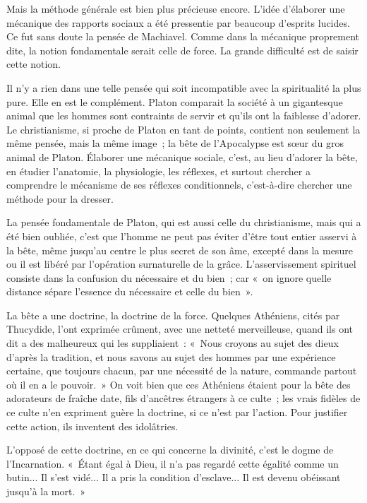 \documentclass[french,twoside]{book} %
\begin{document}
Mais la méthode générale est bien plus précieuse encore. L'idée d'élaborer une mécanique des rapports sociaux a été pressentie par beaucoup d'esprits lucides. Ce fut sans doute la pensée de Machiavel. Comme dans la mécanique proprement dite, la notion fondamentale serait celle de force. La grande difficulté est de saisir cette notion.\par
Il n'y a rien dans une telle pensée qui soit incompatible avec la spiritualité la plus pure. Elle en est le complément. Platon comparait la société à un gigantesque animal que les hommes sont contraints de servir et qu'ils ont la faiblesse d'adorer. Le christianisme, si proche de Platon en tant de points, contient non seulement la même pensée, mais la même image ; la bête de l'Apocalypse est sœur du gros animal de Platon. Élaborer une mécanique sociale, c'est, au lieu d'adorer la bête, en étudier l'anatomie, la physiologie, les réflexes, et surtout chercher a comprendre le mécanisme de ses réflexes conditionnels, c'est-à-dire chercher une méthode pour la dresser.\par
La pensée fondamentale de Platon, qui est aussi celle du christianisme, mais qui a été bien oubliée, c'est que l'homme ne peut pas éviter d'être tout entier asservi à la bête, même jusqu'au centre le plus secret de son âme, excepté dans la mesure ou il est libéré par l'opération surnaturelle de la grâce. L'asservissement spirituel consiste dans la confusion du nécessaire et du bien ; car « on ignore quelle distance sépare l'essence du nécessaire et celle du bien ».\par
La bête a une doctrine, la doctrine de la force. Quelques Athéniens, cités par Thucydide, l'ont exprimée crûment, avec une netteté merveilleuse, quand ils ont dit a des malheureux qui les suppliaient : « Nous croyons au sujet des dieux d'après la tradition, et nous savons au sujet des hommes par une expérience certaine, que toujours chacun, par une nécessité de la nature, commande partout où il en a le pouvoir. » On voit bien que ces Athéniens étaient pour la bête des adorateurs de fraîche date, fils d'ancêtres étrangers à ce culte ; les vrais fidèles de ce culte n'en expriment guère la doctrine, si ce n'est par l'action. Pour justifier cette action, ils inventent des idolâtries.\par
L'opposé de cette doctrine, en ce qui concerne la divinité, c'est le dogme de l'Incarnation. « Étant égal à Dieu, il n'a pas regardé cette égalité comme un butin... Il s'est vidé... Il a pris la condition d'esclave... Il est devenu obéissant jusqu'à la mort. »\par
\end{document}
